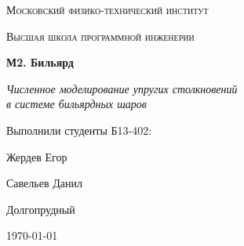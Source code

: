 \begin{titlepage}
    \centering
    {\scshape\Large Московский физико-технический институт \par}
    \vspace{1cm}
    {\scshape\Large Высшая школа программной инженерии \par}
    \vspace{2cm}
    {\huge \textbf{М2. Бильярд} \par}
    \vspace{1.5cm}
    {\Large \textit{Численное моделирование упругих столкновений \\
    в системе бильярдных шаров} \par}
    \vspace{2cm}
    {\Large Выполнили студенты Б13-402: \par}
    {\Large Жердев Егор \par}
    {\Large Савельев Данил \par}
    \vfill
    {\large Долгопрудный \par}
    {\large \today \par}
\end{titlepage}